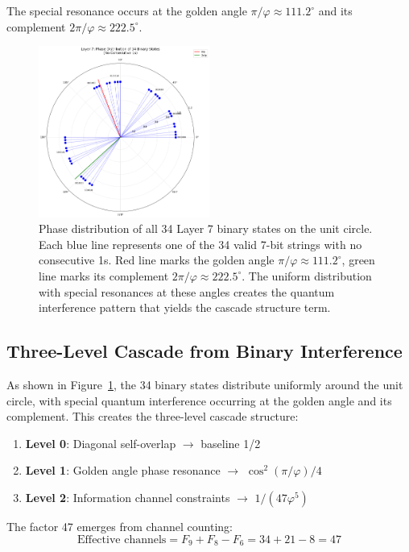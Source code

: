 \documentclass[%
 reprint,
 amsmath,amssymb,
 aps,
 prd,
 10pt,
 nofootinbib,      %
 longbibliography  %
]{revtex4-2}
\theoremstyle{definition}
\theoremstyle{remark}
\begin{document}
The special resonance occurs at the golden angle $\pi/\varphi \approx 111.2^\circ$ and its complement $2\pi/\varphi \approx 222.5^\circ$.

\begin{figure}[!h]
\centering
\includegraphics[width=0.5\textwidth]{layer7_phase_wheel.png}
\caption{Phase distribution of all 34 Layer 7 binary states on the unit circle. Each blue line represents one of the 34 valid 7-bit strings with no consecutive 1s. Red line marks the golden angle $\pi/\varphi \approx 111.2^\circ$, green line marks its complement $2\pi/\varphi \approx 222.5^\circ$. The uniform distribution with special resonances at these angles creates the quantum interference pattern that yields the cascade structure term.}
\label{fig:layer7_phase}
\end{figure}

\subsection{Three-Level Cascade from Binary Interference}

As shown in Figure~\ref{fig:layer7_phase}, the 34 binary states distribute uniformly around the unit circle, with special quantum interference occurring at the golden angle and its complement. This creates the three-level cascade structure:

\begin{enumerate}
\item \textbf{Level 0}: Diagonal self-overlap $\to$ baseline 1/2
\item \textbf{Level 1}: Golden angle phase resonance $\to$ $\cos^2(\pi/\varphi)/4$
\item \textbf{Level 2}: Information channel constraints $\to$ $1/(47\varphi^5)$
\end{enumerate}

The factor 47 emerges from channel counting:
\begin{equation}
\text{Effective channels} = F_9 + F_8 - F_6 = 34 + 21 - 8 = 47
\end{equation}
\end{document}
